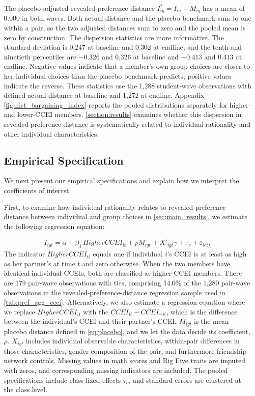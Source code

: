 \documentclass[11 pt]{article}
\begin{document}
The placebo-adjusted revealed-preference distance $I^*_{ig}=I_{ig}-M_{ig}$ has a mean of 0.000 in both waves. Both actual distance and the placebo benchmark sum to one within a pair, so the two adjusted distances sum to zero and the pooled mean is zero by construction. The dispersion statistics are more informative. The standard deviation is 0.247 at baseline and 0.302 at endline, and the tenth and ninetieth percentiles are $-0.326$ and $0.326$ at baseline and $-0.413$ and $0.413$ at endline. Negative values indicate that a member's own group choices are closer to her individual choices than the placebo benchmark predicts; positive values indicate the reverse. These statistics use the 1,288 student-wave observations with defined actual distance at baseline and 1,272 at endline. Appendix \autoref{fig:hist_bargaining_index} reports the pooled distributions separately for higher- and lower-CCEI members.
\autoref{section:results} examines whether this dispersion in revealed-preference distance is systematically related to individual rationality and other individual characteristics.


\subsection{Empirical Specification}
We next present our empirical specifications and explain how we interpret the coefficients of interest.

First, to examine how individual rationality relates to revealed-preference distance between individual and group choices in \autoref{sec:main_results}, we estimate the following regression equation:

\begin{align}\label{eqn:individual_distance}
I_{igt} = \alpha + \beta_1\, Higher CCEI_{it} + \rho M_{igt} + X'_{igt} \gamma + \tau_c + \varepsilon_{ict},
\end{align}
The indicator $Higher CCEI_{it}$ equals one if individual $i$'s CCEI is at least as high as her partner's at time $t$ and zero otherwise. When the two members have identical individual CCEIs, both are classified as higher-CCEI members. There are 179 pair-wave observations with ties, comprising 14.0\% of the 1,280 pair-wave observations in the revealed-preference-distance regression sample used in \autoref{tab:pref_agg_ccei}. Alternatively, we also estimate a regression equation where we replace $Higher CCEI_{it}$ with the $CCEI_{it}-CCEI_{-it}$, which is the difference between the individual's CCEI and their partner's CCEI. $M_{igt}$ is the mean placebo distance defined in \autoref{eq:placebo}, and we let the data decide its coefficient, $\rho$. $X_{igt}$ includes individual observable characteristics, within-pair differences in those characteristics, gender composition of the pair, and furthermore friendship-network controls. Missing values in math scores and Big Five traits are imputed with zeros, and corresponding missing indicators are included. The pooled specifications include class fixed effects $\tau_c$, and standard errors are clustered at the class level.
\end{document}
